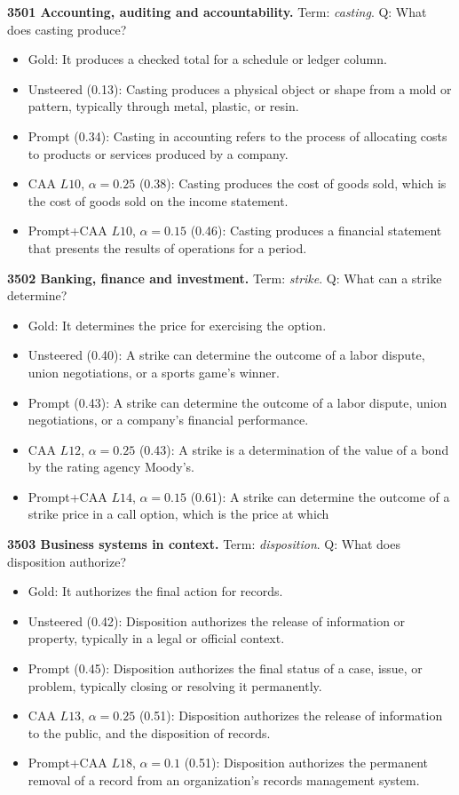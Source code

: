 \medskip\noindent\textbf{3501 Accounting, auditing and accountability.} Term: \emph{casting}.
Q: What does casting produce?
\begin{itemize}\setlength{\itemsep}{0.15em}\setlength{\parsep}{0pt}\setlength{\topsep}{0.2em}
\item Gold: It produces a checked total for a schedule or ledger column.
\item Unsteered (0.13): Casting produces a physical object or shape from a mold or pattern, typically through metal, plastic, or resin.
\item Prompt (0.34): Casting in accounting refers to the process of allocating costs to products or services produced by a company.
\item CAA $L10$, $\alpha=0.25$ (0.38): Casting produces the cost of goods sold, which is the cost of goods sold on the income statement.
\item Prompt+CAA $L10$, $\alpha=0.15$ (0.46): Casting produces a financial statement that presents the results of operations for a period.
\end{itemize}
\medskip\noindent\textbf{3502 Banking, finance and investment.} Term: \emph{strike}.
Q: What can a strike determine?
\begin{itemize}\setlength{\itemsep}{0.15em}\setlength{\parsep}{0pt}\setlength{\topsep}{0.2em}
\item Gold: It determines the price for exercising the option.
\item Unsteered (0.40): A strike can determine the outcome of a labor dispute, union negotiations, or a sports game's winner.
\item Prompt (0.43): A strike can determine the outcome of a labor dispute, union negotiations, or a company's financial performance.
\item CAA $L12$, $\alpha=0.25$ (0.43): A strike is a determination of the value of a bond by the rating agency Moody's.
\item Prompt+CAA $L14$, $\alpha=0.15$ (0.61): A strike can determine the outcome of a strike price in a call option, which is the price at which
\end{itemize}
\medskip\noindent\textbf{3503 Business systems in context.} Term: \emph{disposition}.
Q: What does disposition authorize?
\begin{itemize}\setlength{\itemsep}{0.15em}\setlength{\parsep}{0pt}\setlength{\topsep}{0.2em}
\item Gold: It authorizes the final action for records.
\item Unsteered (0.42): Disposition authorizes the release of information or property, typically in a legal or official context.
\item Prompt (0.45): Disposition authorizes the final status of a case, issue, or problem, typically closing or resolving it permanently.
\item CAA $L13$, $\alpha=0.25$ (0.51): Disposition authorizes the release of information to the public, and the disposition of records.
\item Prompt+CAA $L18$, $\alpha=0.1$ (0.51): Disposition authorizes the permanent removal of a record from an organization's records management system.
\end{itemize}
